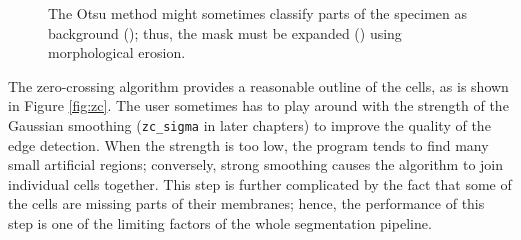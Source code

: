 \documentclass[
  digital,     %
  oneside,     %
  nosansbold,  %
  nocolorbold, %
  lof,         %
  lot,         %
]{fithesis4}
\begin{document}
\begin{figure}
\begin{subfigure}[t]{0.45\linewidth}
        \caption{}
        \label{fig:cell-mask-aft}
    \end{subfigure}
    \caption{The Otsu method might sometimes classify parts of the specimen as
    background (); thus, the mask must be expanded () using morphological erosion.}
    \label{fig:cell-mask}
\end{figure}

The zero-crossing algorithm provides a reasonable outline of the cells, as is
shown in Figure \ref{fig:zc}. The user sometimes has to play around with
the strength of the Gaussian smoothing (\texttt{zc\_sigma} in later chapters) to improve the quality of the edge detection. When the strength is too low, the program tends to find many small artificial regions; conversely, strong smoothing causes the algorithm to join individual cells together. 
This step is further complicated by the fact that some of the cells are missing parts of
their membranes; hence, the performance of this step is one of the limiting factors of
the whole segmentation pipeline.
\end{document}
